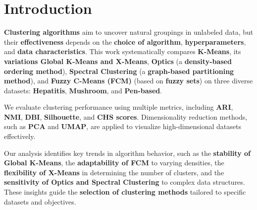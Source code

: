 \section{Introduction}
\textbf{Clustering algorithms} aim to uncover natural groupings in unlabeled data, but their \textbf{effectiveness} depends on the \textbf{choice of algorithm}, \textbf{hyperparameters}, and \textbf{data characteristics}. This work systematically compares \textbf{K-Means}, its \textbf{variations Global K-Means and X-Means}, \textbf{Optics} (a \textbf{density-based ordering method}), \textbf{Spectral Clustering} (a \textbf{graph-based partitioning method}), and \textbf{Fuzzy C-Means (FCM)} (based on \textbf{fuzzy sets}) on three diverse datasets: \textbf{Hepatitis}, \textbf{Mushroom}, and \textbf{Pen-based}.

We evaluate clustering performance using multiple metrics, including \textbf{ARI}, \textbf{NMI}, \textbf{DBI}, \textbf{Silhouette}, and \textbf{CHS scores}. Dimensionality reduction methods, such as \textbf{PCA} and \textbf{UMAP}, are applied to visualize high-dimensional datasets effectively.

Our analysis identifies key trends in algorithm behavior, such as the \textbf{stability of Global K-Means}, the \textbf{adaptability of FCM} to varying densities, the \textbf{flexibility of X-Means} in determining the number of clusters, and the \textbf{sensitivity of Optics and Spectral Clustering} to complex data structures. These insights guide the \textbf{selection of clustering methods} tailored to specific datasets and objectives.
